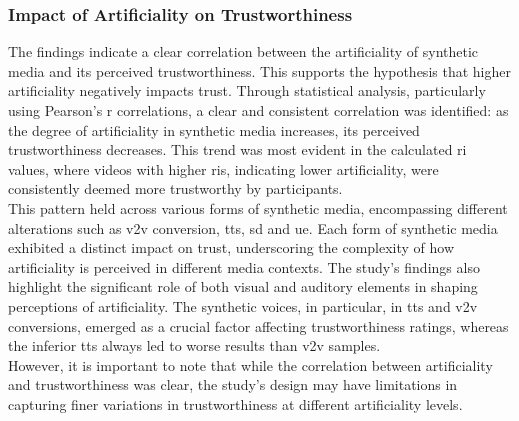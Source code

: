 \documentclass[
  a4paper,  %
  twoside,  %
  bibliography=totoc,
  headsepline,
  cleardoublepage=empty,
  parskip=half,
  draft=false
]{scrbook}
\begin{document}
\subsubsection{Impact of Artificiality on Trustworthiness}
The findings indicate a clear correlation between the artificiality of synthetic media and its perceived trustworthiness. This supports the hypothesis that higher artificiality negatively impacts trust. Through statistical analysis, particularly using Pearson's r correlations, a clear and consistent correlation was identified: as the degree of artificiality in synthetic media increases, its perceived trustworthiness decreases. This trend was most evident in the calculated \gls{ri} values, where videos with higher \gls{ri}s, indicating lower artificiality, were consistently deemed more trustworthy by participants. \\
This pattern held across various forms of synthetic media, encompassing different alterations such as \gls{v2v} conversion, \gls{tts}, \gls{sd} and \gls{ue}. Each form of synthetic media exhibited a distinct impact on trust, underscoring the complexity of how artificiality is perceived in different media contexts. The study's findings also highlight the significant role of both visual and auditory elements in shaping perceptions of artificiality. The synthetic voices, in particular, in \gls{tts} and \gls{v2v} conversions, emerged as a crucial factor affecting trustworthiness ratings, whereas the inferior \gls{tts} always led to worse results than \gls{v2v} samples. \\
However, it is important to note that while the correlation between artificiality and trustworthiness was clear, the study's design may have limitations in capturing finer variations in trustworthiness at different artificiality levels.
\end{document}

